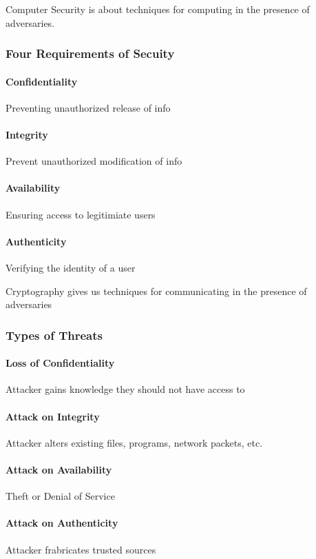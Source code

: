 \documentclass{article}
\begin{document}
Computer Security is about techniques for computing in the presence of adversaries.

\subsubsection{Four Requirements of Secuity}

\paragraph{Confidentiality} Preventing unauthorized release of info
\paragraph{Integrity} Prevent unauthorized modification of info
\paragraph{Availability} Ensuring access to legitimiate users
\paragraph{Authenticity} Verifying the identity of a user

Cryptography gives us techniques for communicating in the presence of adversaries

\subsubsection{Types of Threats}

\paragraph{Loss of Confidentiality} Attacker gains knowledge they should not have access to
\paragraph{Attack on Integrity} Attacker alters existing files, programs, network packets, etc.
\paragraph{Attack on Availability} Theft or Denial of Service
\paragraph{Attack on Authenticity} Attacker frabricates trusted sources
\end{document}
